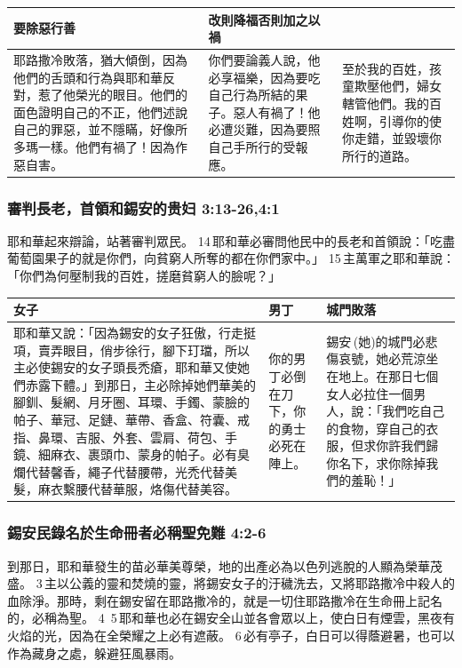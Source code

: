 \begin{table}[H]
\centering 
\begin{tabular}{p{7.75cm}|p{}|p{}}\hline\hline
要除惡行善&改則降福否則加之以禍&\\\hline
耶路撒冷敗落，猶大傾倒，因為他們的舌頭和行為與耶和華反對，惹了他榮光的眼目。他們的面色證明自己的不正，他們述說自己的罪惡，並不隱瞞，好像所多瑪一樣。他們有禍了！因為作惡自害。
&你們要論義人說，他必享福樂，因為要吃自己行為所結的果子。惡人有禍了！他必遭災難，因為要照自己手所行的受報應。
&至於我的百姓，孩童欺壓他們，婦女轄管他們。我的百姓啊，引導你的使你走錯，並毀壞你所行的道路。\\\hline
\end{tabular}
\end{table}

\subsubsection{審判長老，首領和錫安的贵妇 3:13-26,4:1}
耶和華起來辯論，站著審判眾民。 14 耶和華必審問他民中的長老和首領說：「吃盡葡萄園果子的就是你們，向貧窮人所奪的都在你們家中。」 15 主萬軍之耶和華說：「你們為何壓制我的百姓，搓磨貧窮人的臉呢？」

\begin{table}[H]
\centering 
\begin{tabular}{p{10.85cm}|p{1.2cm}|p{4.85cm}}\hline\hline
女子&男丁&城門敗落\\\hline
耶和華又說：「因為錫安的女子狂傲，行走挺項，賣弄眼目，俏步徐行，腳下玎璫，所以主必使錫安的女子頭長禿瘡，耶和華又使她們赤露下體。」到那日，主必除掉她們華美的腳釧、髮網、月牙圈、耳環、手鐲、蒙臉的帕子、華冠、足鏈、華帶、香盒、符囊、戒指、鼻環、吉服、外套、雲肩、荷包、手鏡、細麻衣、裹頭巾、蒙身的帕子。必有臭爛代替馨香，繩子代替腰帶，光禿代替美髮，麻衣繫腰代替華服，烙傷代替美容。
&你的男丁必倒在刀下，你的勇士必死在陣上。
&錫安 (她)的城門必悲傷哀號，她必荒涼坐在地上。在那日七個女人必拉住一個男人，說：「我們吃自己的食物，穿自己的衣服，但求你許我們歸你名下，求你除掉我們的羞恥！」\\\hline
\end{tabular}
\end{table}


\subsubsection{錫安民錄名於生命冊者必稱聖免難 4:2-6}
到那日，耶和華發生的苗必華美尊榮，地的出產必為以色列逃脫的人顯為榮華茂盛。 3 主以公義的靈和焚燒的靈，將錫安女子的汙穢洗去，又將耶路撒冷中殺人的血除淨。那時，剩在錫安留在耶路撒冷的，就是一切住耶路撒冷在生命冊上記名的，必稱為聖。 4  5 耶和華也必在錫安全山並各會眾以上，使白日有煙雲，黑夜有火焰的光，因為在全榮耀之上必有遮蔽。 6 必有亭子，白日可以得蔭避暑，也可以作為藏身之處，躲避狂風暴雨。

